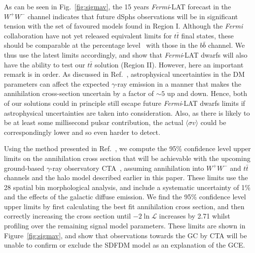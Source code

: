 As can be seen in Fig.~\ref{fig:sigmav}, the 15 years \textit{Fermi}-LAT forecast in the $W^{+}W^{-}$ channel indicates that future dSphs observations will be in significant tension with the set of favoured models found in Region I. Although the \textit{Fermi} collaboration have not yet released equivalent limits for $t\bar{t}$ final states, these should be comparable at the percentage level~\cite{Cirelli_cookbook} with those in the $b\bar{b}$ channel. We thus use the latest limits accordingly, and show that \textit{Fermi}-LAT dwarfs will also have the ability to test our $t\bar{t}$ solution (Region II). However, here an important remark is in order. As discussed in Ref.~\cite{Caloreetal:Taleoftails}, astrophysical uncertainties in the DM parameters can affect the expected $\gamma$-ray emission in a manner that makes the annihilation cross-section uncertain by a factor of $\sim 5$ up and down. Hence, both of our solutions could in principle still escape future \textit{Fermi}-LAT dwarfs limits if astrophysical uncertainties are taken into consideration. Also, as there is likely to be at least some millisecond pulsar contribution, the actual $\langle\sigma v\rangle$ could be correspondingly lower and so even harder to detect.     

Using the method presented in Ref.~\cite{Silverwood:2014yza}, we compute the 95\% confidence level upper limits on the annihilation cross section that will be achievable with the upcoming ground-based $\gamma$-ray observatory CTA~\cite{2011ExA....32..193A}, assuming annihilation into $W^+W^-$ and $t\bar{t}$ channels and the halo model described earlier in this paper. These limits use the 28 spatial bin morphological analysis, and include a systematic uncertainty of 1\% and the effects of the galactic diffuse emission. We find the 95\% confidence level upper limits by first calculating the best fit annihilation cross section, and then correctly increasing the cross section until $-2 \ln \mathcal{L}$ increases by 2.71 whilst profiling over the remaining signal model parameters. These limits are shown in Figure~\ref{fig:sigmav}, and show that observations towards the GC by CTA will be unable to confirm or exclude the SDFDM model as an explanation of the GCE. 

